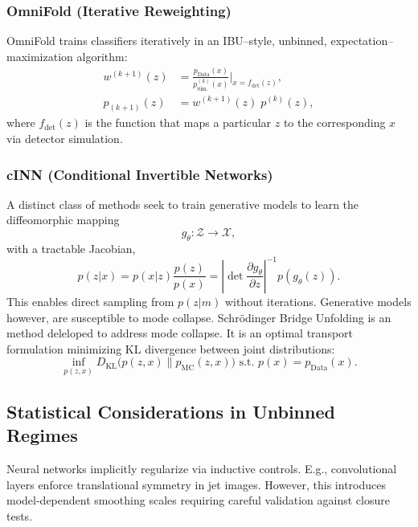 \subsubsection{OmniFold (Iterative Reweighting)}  
OmniFold trains classifiers iteratively in an IBU--style, unbinned, expectation--maximization algorithm:
\begin{align}
w^{(k+1)}(z) &= \frac{p_{\text{Data}}(x)}{p_{\text{Sim.}}^{(k)}(x)} \bigg|_{x=f_{\text{det}}(z)}, \\
p_{(k+1)}(z) &= w^{(k+1)}(z)\; p^{(k)}(z),
\end{align}
where \(f_{\text{det}}(z)\) is the function that maps a particular \(z\) to the corresponding \(x\) via detector simulation.

\subsubsection{cINN (Conditional Invertible Networks)}
A distinct class of methods seek to train generative models to learn the diffeomorphic mapping 
\begin{equation}
g_\theta: \mathcal{Z} \to \mathcal{X},
\end{equation}
with a tractable Jacobian,
\begin{equation}
p(z|x) = p(x|z) \frac{p(z)}{p(x)} = \left|\det \frac{\partial g_\theta}{\partial z}\right|^{-1} p(g_\theta(z)).
\end{equation}
This enables direct sampling from \(p(z|m)\) without iterations.
%
Generative models however, are susceptible to mode collapse.
%
Schr\"odinger Bridge Unfolding is an method deleloped to address mode collapse.
%
It is an optimal transport formulation minimizing KL divergence between joint distributions:
\begin{equation}
    \inf_{p(z,x)} D_{\text{KL}}\Big(p(z,x) \parallel p_{\text{MC}}(z,x)\Big) \text{ s.t. } p(x) = p_{\text{Data}}(x).
\end{equation}


\subsection{Statistical Considerations in Unbinned Regimes}  

Neural networks implicitly regularize via inductive controls. 
%
E.g., convolutional layers enforce translational symmetry in jet images.
%
However, this introduces model-dependent smoothing scales requiring careful validation against closure tests.

